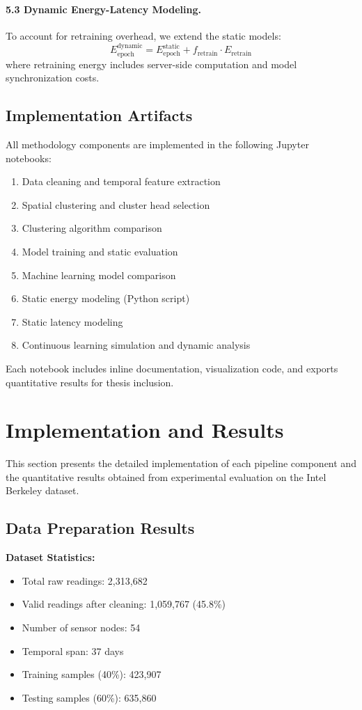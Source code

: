 \documentclass[12pt,a4paper]{article}
\begin{document}
\paragraph{5.3 Dynamic Energy-Latency Modeling.}
To account for retraining overhead, we extend the static models:
\[
  E_{\text{epoch}}^{\text{dynamic}} = E_{\text{epoch}}^{\text{static}} + f_{\text{retrain}} \cdot E_{\text{retrain}}
\]
where retraining energy includes server-side computation and model synchronization costs.

\subsection{Implementation Artifacts}

All methodology components are implemented in the following Jupyter notebooks:
\begin{enumerate}
    \item Data cleaning and temporal feature extraction
    \item Spatial clustering and cluster head selection
    \item Clustering algorithm comparison
    \item Model training and static evaluation
    \item Machine learning model comparison
    \item Static energy modeling (Python script)
    \item Static latency modeling
    \item Continuous learning simulation and dynamic analysis
\end{enumerate}

Each notebook includes inline documentation, visualization code, and exports quantitative results for thesis inclusion.


\newpage
\section{Implementation and Results}

This section presents the detailed implementation of each pipeline component and the quantitative results obtained from experimental evaluation on the Intel Berkeley dataset.

\subsection{Data Preparation Results}

\textbf{Dataset Statistics:}
\begin{itemize}
    \item Total raw readings: 2,313,682
    \item Valid readings after cleaning: 1,059,767 (45.8\%)
    \item Number of sensor nodes: 54
    \item Temporal span: 37 days
    \item Training samples (40\%): 423,907
    \item Testing samples (60\%): 635,860
\end{itemize}
\end{document}
